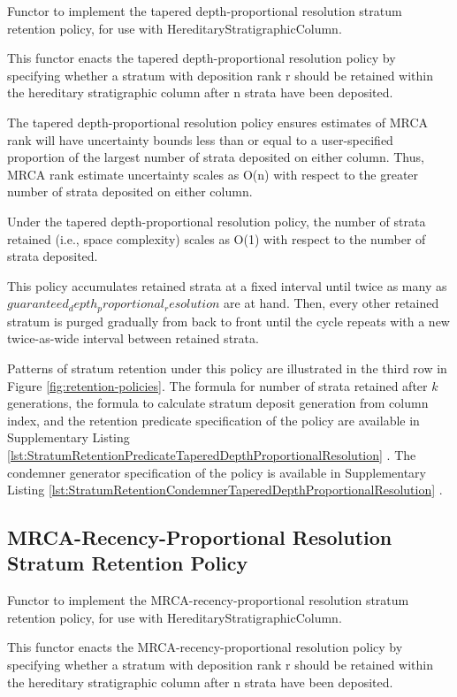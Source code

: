Functor to implement the tapered depth-proportional resolution stratum
retention policy, for use with HereditaryStratigraphicColumn.

This functor enacts the tapered depth-proportional resolution policy by
specifying whether a stratum with deposition rank r should be retained
within the hereditary stratigraphic column after n strata have been
deposited.

The tapered depth-proportional resolution policy ensures estimates of MRCA
rank will have uncertainty bounds less than or equal to a user-specified
proportion of the largest number of strata deposited on either column.
Thus, MRCA rank estimate uncertainty scales as O(n) with respect to the
greater number of strata deposited on either column.

Under the tapered depth-proportional resolution policy, the number of strata
retained (i.e., space complexity) scales as O(1) with respect to the number
of strata deposited.

This policy accumulates retained strata at a fixed interval until twice
as many as $guaranteed_depth_proportional_resolution$ are at hand. Then,
every other retained stratum is purged gradually from back to front
until the cycle repeats with a new twice-as-wide interval between
retained strata.

Patterns of stratum retention under this policy are illustrated in the third row in Figure \ref{fig:retention-policies}.
The formula for number of strata retained after $k$ generations, the formula to calculate stratum deposit generation from column index, and the retention predicate specification of the policy are available in Supplementary Listing \ref{lst:StratumRetentionPredicateTaperedDepthProportionalResolution} \citep{moreno2022hstratconceptsupplement}.
The condemner generator specification of the policy is available in Supplementary Listing \ref{lst:StratumRetentionCondemnerTaperedDepthProportionalResolution} \citep{moreno2022hstratconceptsupplement}.

\subsection{MRCA-Recency-Proportional Resolution Stratum Retention Policy}

Functor to implement the MRCA-recency-proportional resolution stratum
retention policy, for use with HereditaryStratigraphicColumn.

This functor enacts the MRCA-recency-proportional resolution policy by
specifying whether a stratum with deposition rank r should be retained
within the hereditary stratigraphic column after n strata have been
deposited.

